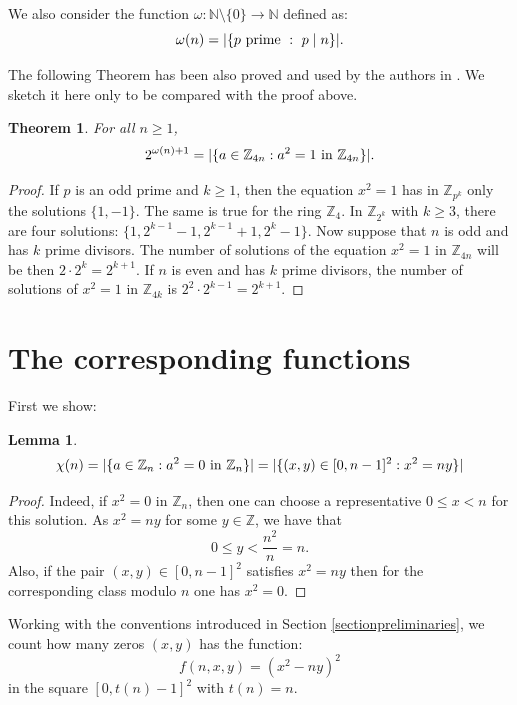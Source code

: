 \documentclass[10pt]{article}
\theoremstyle{plain}
\newtheorem{lemma}{Lemma}[section]
\newtheorem{theorem}{Theorem}[section]
\begin{document}
We also consider the function $\omega : \mathbb N \setminus \{0\} \rightarrow \mathbb N$ defined as:
$$\omega(n) = | \{ p \textup{ prime }:\,\, p \mid n \}|.$$

The following Theorem has been also proved and used by the authors in \cite{prunescushunia2024primes}. We sketch it here only to be compared with the proof above.

\begin{theorem}\label{eqmodomega}
    For all $n \geq 1$,
    $$2^{\omega(n) + 1} = |\{ a \in \mathbb Z_{4n} : a^2 = 1 \textup{  in } \mathbb Z_{4n} \} |.$$
\end{theorem}

\begin{proof} If $p$ is an odd prime and $k \geq 1$, then the equation $x^2 = 1$ has in $\mathbb Z_{p^k}$ only the solutions $\{1, -1\}$. The same is true for the ring $\mathbb Z_4$. In $\mathbb Z_{2^k}$ with $k \geq 3$, there are four solutions: $\{1, 2^{k-1} - 1, 2^{k-1} + 1, 2^k -1\}$. Now suppose that $n$ is odd and has $k$ prime divisors. The number of solutions of the equation $x^2 = 1$ in $\mathbb Z_{4n}$ will be then $2 \cdot 2^k = 2^{k+1}$. If $n$ is even and has $k$ prime divisors, the number of solutions of $x^2 = 1$ in $\mathbb Z_{4k}$ is $2^2 \cdot 2^{k-1} = 2^{k+1}$.
\end{proof}


\section{The corresponding functions}\label{sectioncorrespondingfunctions}

First we show:

\begin{lemma}
$$\chi(n) = |\{ a \in \mathbb Z_n : a^2 = 0 \textup{  in } \mathbb Z_n \} | = |\{ (x,y) \in [0, n-1]^2 : x^2 = ny\} | $$
\end{lemma}

\begin{proof}
    Indeed, if $x^2 = 0$ in $\mathbb Z_n$, then one can choose a representative $0 \leq x < n$ for this solution. As $x^2 = ny$ for some $y \in \mathbb Z$, we have that
    $$0 \leq y < \frac{n^2}{n} = n.$$
    Also, if the pair $(x,y) \in [0, n-1]^2$ satisfies $x^2 = ny$ then for the corresponding class modulo $n$ one has $x^2 = 0$.
\end{proof}

Working with the conventions introduced in Section \ref{sectionpreliminaries}, we count how many zeros $(x,y)$ has the function:
$$f(n, x, y) = (x^2 - ny)^2$$
in the square $[0, t(n)-1]^2$ with $t(n) = n$.
\end{document}
